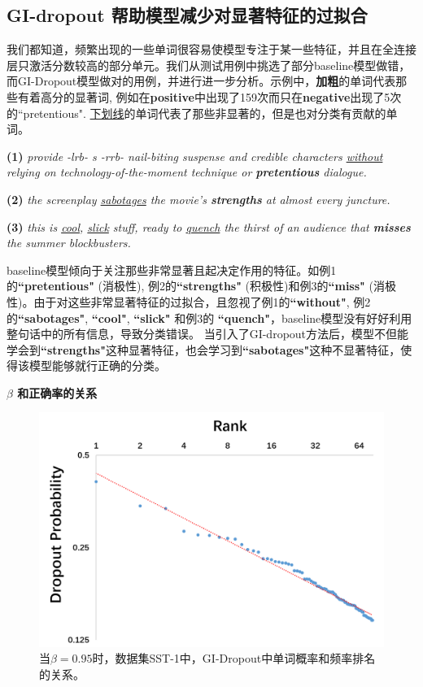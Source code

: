 \subsection{GI-dropout 帮助模型减少对显著特征的过拟合}
我们都知道，频繁出现的一些单词很容易使模型专注于某一些特征，并且在全连接层只激活分数较高的部分单元。我们从测试用例中挑选了部分baseline模型做错，而GI-Dropout模型做对的用例，并进行进一步分析。示例中，\textbf{加粗}的单词代表那些有着高分的显著词, 例如在\textbf{positive}中出现了159次而只在\textbf{negative}出现了5次的``pretentious". \underline{下划线}的单词代表了那些非显著的，但是也对分类有贡献的单词。 

\textbf{(1)}  \textit{provide -lrb- s -rrb- nail-biting suspense and credible characters \underline{without} relying on technology-of-the-moment technique or \textbf{pretentious} dialogue.}

\textbf{(2)}  \textit{the screenplay \underline{sabotages} the movie's \textbf{strengths} at almost every juncture.} 

\textbf{(3)}  \textit{this is \underline{cool}, \underline{slick} stuff, ready to \underline{quench} the thirst of an audience that \textbf{misses} the summer blockbusters.} 

baseline模型倾向于关注那些非常显著且起决定作用的特征。如例1的\textbf{``pretentious"} (消极性), 例2的\textbf{``strengths"} (积极性)和例3的\textbf{``miss"} (消极性)。由于对这些非常显著特征的过拟合，且忽视了例1的\textbf{``without"}, 例2的\textbf{``sabotages"}, \textbf{``cool"}, \textbf{``slick"} 和例3的 \textbf{``quench"}，baseline模型没有好好利用整句话中的所有信息，导致分类错误。
当引入了GI-dropout方法后，模型不但能学会到\textbf{``strengths"}这种显著特征，也会学习到\textbf{``sabotages"}这种不显著特征，使得该模型能够就行正确的分类。

\textbf{$\beta$ 和正确率的关系}

\begin{figure}[!t]
\centering
  \includegraphics[width=\linewidth]{figure/zipf.png}
  \caption{当$\beta = 0.95$时，数据集SST-1中，GI-Dropout中单词概率和频率排名的关系。}
  \label{fig:zipf}
\end{figure}

